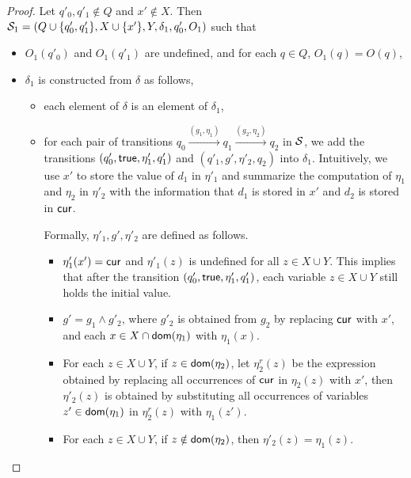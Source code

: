 \begin{appendix}
\begin{proof}
Let $q'_{0},q'_{1} \not \in Q$ and $x' \not \in X$. Then ${\mathcal{S} }_1 = (Q \cup \{q'_{0},q'_1\}, X \cup \{x'\}, Y, \delta_1, q'_{0}, O_1)$ such that 
\begin{itemize}
\item $O_1(q'_0)$ and $O_1(q'_1)$ are undefined, and for each $q \in Q$, $O_1(q)=O(q)$,
%
\item $\delta_1$ is constructed from $\delta$ as follows,
\begin{itemize}
\item each element of $\delta$ is an element of $\delta_1$,
%
\item for each pair of transitions $q_0 \xrightarrow{(g_1,\eta_1)} q_1 \xrightarrow{(g_2,\eta_2)} q_2$ in ${\mathcal{S} }$, we add the transitions $(q'_0, \mathsf{true}, \eta'_1, q'_1)$ and $(q'_1, g', \eta'_2, q_2)$ into $\delta_1$. Intuitively, we use $x'$ to store the value of $d_1$ in $ \eta'_1$ and summarize the computation of $\eta_1$ and $\eta_2$ in $\eta'_2$ with the information that $d_1$ is stored in $x'$ and $d_2$ is stored in $\mathsf{cur}$.


Formally, $\eta'_1, g', \eta'_2$ are defined as follows.
\begin{itemize}
\item $\eta'_1(x')=\mathsf{cur}$ and $\eta'_1(z)$ is undefined for all $z \in X\cup Y$. This implies that after the transition $(q'_0, \mathsf{true}, \eta'_1, q'_1)$, each variable $z \in X \cup Y$ still holds the initial value.  
%
\item $g' = g_1 \wedge g'_2$, where $g'_2$ is obtained from $g_2$ by replacing $\mathsf{cur}$ with $x'$, and each $x \in X\cap \mathsf{dom}(\eta_1)$ with $\eta_1(x)$.
%
\item For each $z \in X\cup Y$, if $z \in \mathsf{dom}(\eta_2)$, let $\eta_2^r(z)$ be the expression obtained by replacing all occurrences of $\mathsf{cur}$ in $\eta_2(z)$ with $x'$,
then $\eta'_2(z)$ is obtained by substituting all occurrences of variables $z' \in \mathsf{dom}(\eta_1)$ in $\eta_2^r(z)$ with $\eta_1(z')$. 
\item For each $z \in X\cup Y$, if $z \notin \mathsf{dom}(\eta_2)$, then $\eta'_2(z)=\eta_1(z)$.
%

\end{itemize}
\end{itemize}
\end{itemize}
\end{proof}
\end{appendix}
